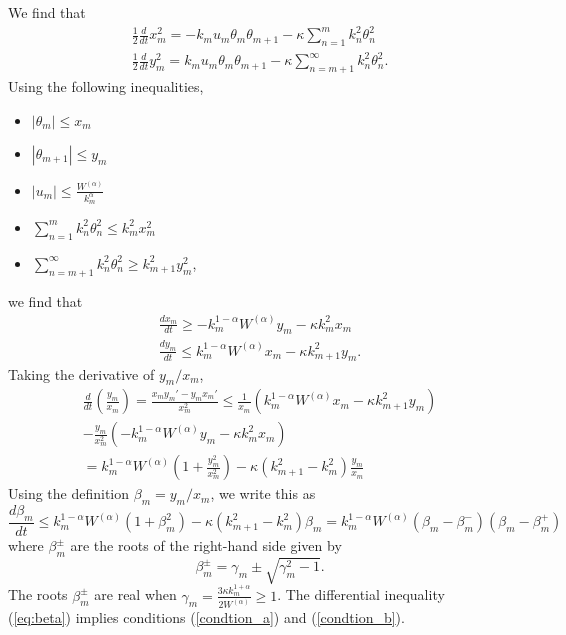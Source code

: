 We find that
\begin{subequations}
\begin{align}
	\frac{1}{2}\frac{d}{dt}x_{m}^{2}=-k_{m}u_{m}\theta_{m}\theta_{m+1}-\kappa \sum_{n=1}^{m}k_{n}^2\theta_{n}^2 \\
	\frac{1}{2}\frac{d}{dt}y_{m}^{2}=k_{m}u_{m}\theta_{m}\theta_{m+1}-\kappa \sum_{n=m+1}^{\infty}k_{n}^2\theta_{n}^2.
\end{align}
\end{subequations}
Using the following inequalities,
\begin{itemize}
\item $|\theta_{m}|\leq x_{m}$
\item $ |\theta_{m+1}|\leq y_{m}$
\item $|u_{m}|\leq \frac{W^{(\alpha)}}{k^{\alpha}_{m}}$
\item $\sum_{n=1}^{m} k_{n}^{2}\theta_{n}^2\leq  k_{m}^{2}x_{m}^{2}$
\item $ \sum_{n=m+1}^{\infty } k_{n}^2\theta_{n}^{2}\geq k^{2}_{m+1}y_{m}^{2}$,
\end{itemize}
we find that 
\begin{subequations}
\begin{align}
\label{ineq_1}
\frac{dx_{m}}{dt} \geq  - k_{m}^{1-\alpha}W^{(\alpha)} y_{m} - \kappa k_{m}^2 x_{m} \\
\label{ineq_2}
\frac{dy_{m}}{dt} \leq k_{m}^{1-\alpha}W^{(\alpha)}x_{m} - \kappa k_{m+1}^2 y_{m} .
\end{align}
\end{subequations}
Taking the derivative of $y_{m}/x_{m}$,
\begin{multline}
\frac{d}{dt}\left(\frac{y_{m}}{x_{m}}\right)=\frac{x_{m}y_{m}'-y_{m}x_{m}'}{x_{m}^2}\leq \frac{1}{x_{m}}(k_{m}^{1-\alpha}W^{(\alpha)}x_{m} - \kappa k_{m+1}^2 y_{m}) \\
- \frac{y_{m}}{x_{m}^2}( - k_{m}^{1-\alpha}W^{(\alpha)}y_{m} - \kappa k_{m}^2 x_{m} ) \\
=k_{m}^{1-\alpha}W^{(\alpha)}\left(1+\frac{y_{m}^2}{x_{m}^{2}}\right) - \kappa (k_{m+1}^2-k_m^2)\frac{y_{m}}{x_{m}}
\end{multline}
Using the definition $\beta_{m} = y_{m}/x_{m}$, we write this as 
\begin{equation}
\label{eq:beta}
\frac{d\beta_{m}}{dt}\leq k_{m}^{1-\alpha}W^{(\alpha)}\left(1+\beta_{m}^2\right) - \kappa (k_{m+1}^2-k_m^2)\beta_{m}=k_{m}^{1-\alpha}W^{(\alpha)}(\beta_{m} -\beta_{m}^{-})(\beta_{m} -\beta_{m}^{+})
\end{equation}
where $\beta_{m}^{\pm}$ are the roots of the right-hand side given by
\begin{equation*}
\beta_{m}^{\pm}=\gamma_{m}  \pm \sqrt{\gamma_{m}^{2}  - 1}.
\end{equation*}
The roots $\beta_{m}^{\pm}$ are real when $\gamma_{m} =\frac{3\kappa k_{m}^{1+\alpha} }{2W^{(\alpha)}} \geq 1$. The differential inequality (\ref{eq:beta}) implies conditions (\ref{condtion_a}) and (\ref{condtion_b}).


